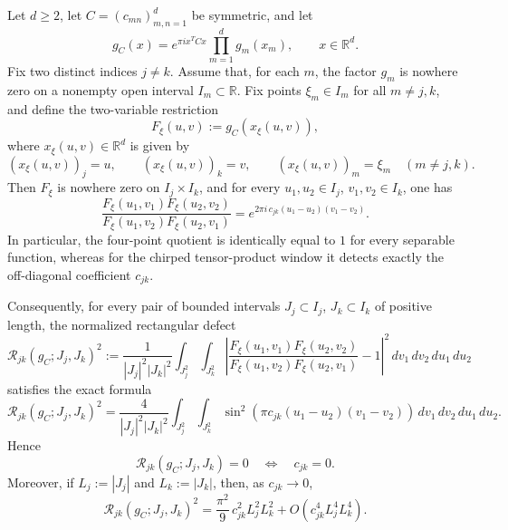 \documentclass[10pt,a4paper]{amsart}
\newcommand{\R}{\mathbb{R}}
\begin{document}
\begin{theorem}
\label{thm:four_point_obstruction}
{Let $d\ge 2$, let $C=(c_{mn})_{m,n=1}^d$ be symmetric, and let
$$
g_C(x)
=
e^{\pi i x^T Cx}\prod_{m=1}^d g_m(x_m),
\qquad x\in\R^d.
$$
Fix two distinct indices $j\neq k$. Assume that, for each $m$, the factor $g_m$
is nowhere zero on a nonempty open interval $I_m\subset\R$. Fix points
$\xi_m\in I_m$ for all $m\neq j,k$, and define the two-variable restriction
$$
F_\xi(u,v)
:=
g_C(x_\xi(u,v)),
$$
where $x_\xi(u,v)\in\R^d$ is given by
$$
(x_\xi(u,v))_j=u,\qquad
(x_\xi(u,v))_k=v,\qquad
(x_\xi(u,v))_m=\xi_m\quad (m\neq j,k).
$$
Then $F_\xi$ is nowhere zero on $I_j\times I_k$, and for every
$u_1,u_2\in I_j$, $v_1,v_2\in I_k$, one has
$$
\frac{
F_\xi(u_1,v_1)F_\xi(u_2,v_2)
}{
F_\xi(u_1,v_2)F_\xi(u_2,v_1)
}
=
e^{2\pi i\,c_{jk}(u_1-u_2)(v_1-v_2)}.
$$
In particular, the four-point quotient is identically equal to $1$ for every
separable function, whereas for the chirped tensor-product window it detects exactly
the off-diagonal coefficient $c_{jk}$.}

{Consequently, for every pair of bounded intervals
$J_j\subset I_j$, $J_k\subset I_k$ of positive length, the normalized rectangular defect
$$
\mathcal R_{jk}(g_C;J_j,J_k)^2
:=
\frac{1}{|J_j|^2|J_k|^2}
\int_{J_j^2}\int_{J_k^2}
\left|
\frac{
F_\xi(u_1,v_1)F_\xi(u_2,v_2)
}{
F_\xi(u_1,v_2)F_\xi(u_2,v_1)
}
-1
\right|^2
\,dv_1\,dv_2\,du_1\,du_2
$$
satisfies the exact formula
$$
\mathcal R_{jk}(g_C;J_j,J_k)^2
=
\frac{4}{|J_j|^2|J_k|^2}
\int_{J_j^2}\int_{J_k^2}
\sin^2\!\left(
\pi c_{jk}(u_1-u_2)(v_1-v_2)
\right)
\,dv_1\,dv_2\,du_1\,du_2.
$$
Hence
$$
\mathcal R_{jk}(g_C;J_j,J_k)=0
\quad\Longleftrightarrow\quad
c_{jk}=0.
$$
Moreover, if $L_j:=|J_j|$ and $L_k:=|J_k|$, then, as $c_{jk}\to0$,
$$
\mathcal R_{jk}(g_C;J_j,J_k)^2
=
\frac{\pi^2}{9}\,c_{jk}^2 L_j^2L_k^2
+
O\!\left(c_{jk}^4 L_j^4L_k^4\right).
$$}
\end{theorem}
\end{document}
